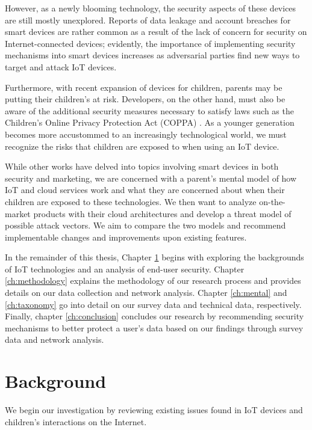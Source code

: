\documentclass[12pt]{ucthesis}
\begin{document}
However, as a newly blooming technology, the security aspects of these devices are still mostly unexplored. Reports of data leakage and account breaches \cite{wp:camera} for smart devices are rather common as a result of the lack of concern for security on Internet-connected devices; evidently, the importance of implementing security mechanisms into smart devices increases as adversarial parties find new ways to target and attack IoT devices.

Furthermore, with recent expansion of devices for children, parents may be putting their children's at risk. Developers, on the other hand, must also be aware of the additional security measures necessary to satisfy laws such as the Children's Online Privacy Protection Act (COPPA) \cite{reyes:coppa}. As a younger generation becomes more accustommed to an increasingly technological world, we must recognize the risks that children are exposed to when using an IoT device. 

While other works have delved into topics involving smart devices in both security and marketing, we are concerned with a parent's mental model of how IoT and cloud services work and what they are concerned about when their children are exposed to these technologies. We then want to analyze on-the-market products with their cloud architectures and develop a threat model of possible attack vectors. We aim to compare the two models and recommend implementable changes and improvements upon existing features.

In the remainder of this thesis, Chapter \ref{ch:background} begins with exploring the backgrounds of IoT technologies and an analysis of end-user security. Chapter \ref{ch:methodology} explains the methodology of our research process and provides details on our data collection and network analysis. Chapter \ref{ch:mental} and \ref{ch:taxonomy} go into detail on our survey data and technical data, respectively. Finally, chapter \ref{ch:conclusion} concludes our research by recommending security mechanisms to better protect a user's data based on our findings through survey data and network analysis.

\chapter{Background}
\label{ch:background}
We begin our investigation by reviewing existing issues found in IoT devices and children's interactions on the Internet.
\end{document}
